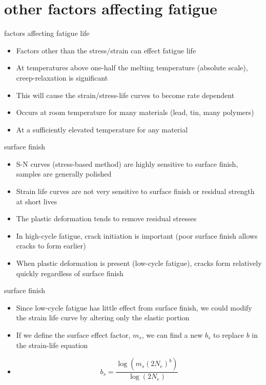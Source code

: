 \documentclass[10pt]{beamer}
\begin{document}
\section{other factors affecting fatigue}
\begin{frame}{factors affecting fatigue life}
	\begin{itemize}[<+->]
		\item Factors other than the stress/strain can effect fatigue life
		\item At temperatures above one-half the melting temperature (absolute scale), creep-relaxation is significant
		\item This will cause the strain/stress-life curves to become rate dependent
		\item Occurs at room temperature for many materials (lead, tin, many polymers)
		\item At a sufficiently elevated temperature for any material
	\end{itemize}
\end{frame}

\begin{frame}{surface finish}
	\begin{itemize}[<+->]
		\item S-N curves (stress-based method) are highly sensitive to surface finish, samples are generally polished
		\item Strain life curves are not very sensitive to surface finish or residual strength at short lives
		\item The plastic deformation tends to remove residual stresses
		\item In high-cycle fatigue, crack initiation is important (poor surface finish allows cracks to form earlier)
		\item When plastic deformation is present (low-cycle fatigue), cracks form relatively quickly regardless of surface finish
	\end{itemize}
\end{frame}

\begin{frame}{surface finish}
	\begin{itemize}[<+->]
		\item Since low-cycle fatigue has little effect from surface finish, we could modify the strain life curve by altering only the elastic portion
		\item If we define the surface effect factor, $m_s$, we can find a new $b_s$ to replace $b$ in the strain-life equation
		\item[] \begin{equation}
		b_s = \frac{\log\left(m_s (2N_e)^b\right)}{\log(2N_e)}
		\end{equation}
	\end{itemize}
\end{frame}
\end{document}
